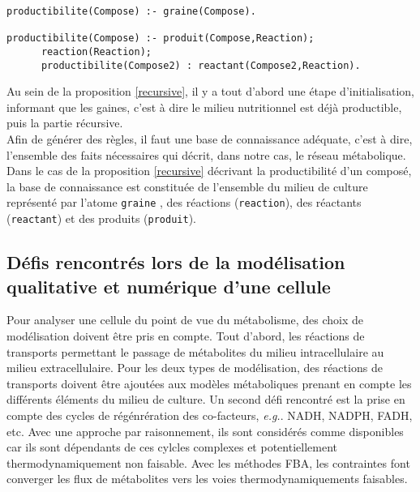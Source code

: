 \documentclass[../main.tex]{subfiles}
\begin{document}
\begin{lstlisting}[mathescape=True,label={recursive},caption={Code ASP permettant de calculer le scope métabolique},captionpos=b]
productibilite(Compose) :- graine(Compose).

productibilite(Compose) :- produit(Compose,Reaction); 
      reaction(Reaction); 
      productibilite(Compose2) : reactant(Compose2,Reaction).
\end{lstlisting}


Au sein de la proposition \ref{recursive}, il y a tout d'abord une étape d'initialisation, informant que les gaines, c'est à dire le milieu nutritionnel est déjà productible, puis la partie récursive. \\

Afin de générer des règles, il faut une base de connaissance adéquate, c'est à dire, l'ensemble des faits nécessaires qui décrit, dans notre cas, le réseau métabolique. Dans le cas de la proposition \ref{recursive} décrivant la productibilité d'un composé, la base de connaissance est constituée de l'ensemble du milieu de culture représenté par l'atome \texttt{graine} ,  des réactions (\texttt{reaction}), des réactants (\texttt{reactant}) et des produits (\texttt{produit}).


\subsection{Défis rencontrés lors de la modélisation qualitative et numérique d'une cellule}
\label{defi}
Pour analyser une cellule du point de vue du métabolisme, des choix de modélisation doivent être pris en compte. Tout d'abord, les réactions de transports permettant le passage de métabolites du milieu intracellulaire au milieu extracellulaire. Pour les deux types de modélisation, des réactions de transports doivent être ajoutées aux modèles métaboliques prenant en compte les différents éléments du milieu de culture. Un second défi rencontré est la prise en compte des cycles de régénrération des co-facteurs, \textit{e.g.}. NADH, NADPH, FADH, etc. Avec une approche par raisonnement, ils sont considérés comme disponibles car ils sont dépendants de ces cylcles complexes et potentiellement thermodynamiquement non faisable. Avec les méthodes FBA, les contraintes font converger les flux de métabolites  vers les voies thermodynamiquements faisables.\\
\end{document}

